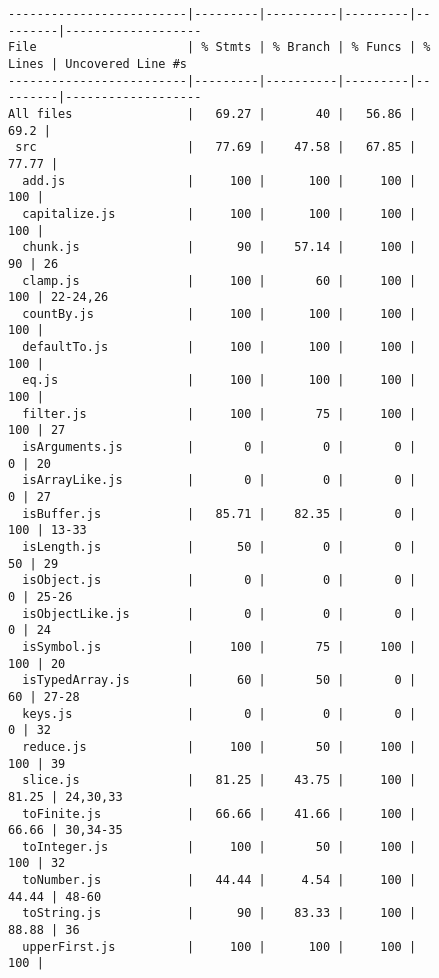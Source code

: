 \documentclass[]{article}
\begin{document}
\begin{figure}[H]
	\centering
	\scriptsize
	\begin{lstlisting}
-------------------------|---------|----------|---------|---------|-------------------
File                     | % Stmts | % Branch | % Funcs | % Lines | Uncovered Line #s 
-------------------------|---------|----------|---------|---------|-------------------
All files                |   69.27 |       40 |   56.86 |    69.2 |                   
 src                     |   77.69 |    47.58 |   67.85 |   77.77 |                   
  add.js                 |     100 |      100 |     100 |     100 |                   
  capitalize.js          |     100 |      100 |     100 |     100 |                   
  chunk.js               |      90 |    57.14 |     100 |      90 | 26                
  clamp.js               |     100 |       60 |     100 |     100 | 22-24,26          
  countBy.js             |     100 |      100 |     100 |     100 |                   
  defaultTo.js           |     100 |      100 |     100 |     100 |                   
  eq.js                  |     100 |      100 |     100 |     100 |                   
  filter.js              |     100 |       75 |     100 |     100 | 27                
  isArguments.js         |       0 |        0 |       0 |       0 | 20                
  isArrayLike.js         |       0 |        0 |       0 |       0 | 27                
  isBuffer.js            |   85.71 |    82.35 |       0 |     100 | 13-33             
  isLength.js            |      50 |        0 |       0 |      50 | 29                
  isObject.js            |       0 |        0 |       0 |       0 | 25-26             
  isObjectLike.js        |       0 |        0 |       0 |       0 | 24                
  isSymbol.js            |     100 |       75 |     100 |     100 | 20                
  isTypedArray.js        |      60 |       50 |       0 |      60 | 27-28             
  keys.js                |       0 |        0 |       0 |       0 | 32                
  reduce.js              |     100 |       50 |     100 |     100 | 39                
  slice.js               |   81.25 |    43.75 |     100 |   81.25 | 24,30,33          
  toFinite.js            |   66.66 |    41.66 |     100 |   66.66 | 30,34-35          
  toInteger.js           |     100 |       50 |     100 |     100 | 32                
  toNumber.js            |   44.44 |     4.54 |     100 |   44.44 | 48-60             
  toString.js            |      90 |    83.33 |     100 |   88.88 | 36                
  upperFirst.js          |     100 |      100 |     100 |     100 |                   

\end{lstlisting}
\end{figure}
\end{document}
